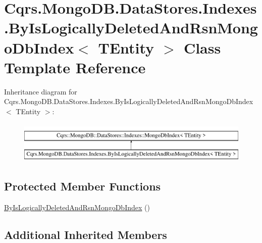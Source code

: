 \hypertarget{classCqrs_1_1MongoDB_1_1DataStores_1_1Indexes_1_1ByIsLogicallyDeletedAndRsnMongoDbIndex}{}\section{Cqrs.\+Mongo\+D\+B.\+Data\+Stores.\+Indexes.\+By\+Is\+Logically\+Deleted\+And\+Rsn\+Mongo\+Db\+Index$<$ T\+Entity $>$ Class Template Reference}
\label{classCqrs_1_1MongoDB_1_1DataStores_1_1Indexes_1_1ByIsLogicallyDeletedAndRsnMongoDbIndex}
Inheritance diagram for Cqrs.\+Mongo\+D\+B.\+Data\+Stores.\+Indexes.\+By\+Is\+Logically\+Deleted\+And\+Rsn\+Mongo\+Db\+Index$<$ T\+Entity $>$\+:\begin{figure}[H]
\begin{center}
\leavevmode
\includegraphics[height=2.000000cm]{classCqrs_1_1MongoDB_1_1DataStores_1_1Indexes_1_1ByIsLogicallyDeletedAndRsnMongoDbIndex}
\end{center}
\end{figure}
\subsection*{Protected Member Functions}
\begin{DoxyCompactItemize}
\item 
\hyperlink{classCqrs_1_1MongoDB_1_1DataStores_1_1Indexes_1_1ByIsLogicallyDeletedAndRsnMongoDbIndex_add37df2db333254d1489f13cd9a668a1_add37df2db333254d1489f13cd9a668a1}{By\+Is\+Logically\+Deleted\+And\+Rsn\+Mongo\+Db\+Index} ()
\end{DoxyCompactItemize}
\subsection*{Additional Inherited Members}


